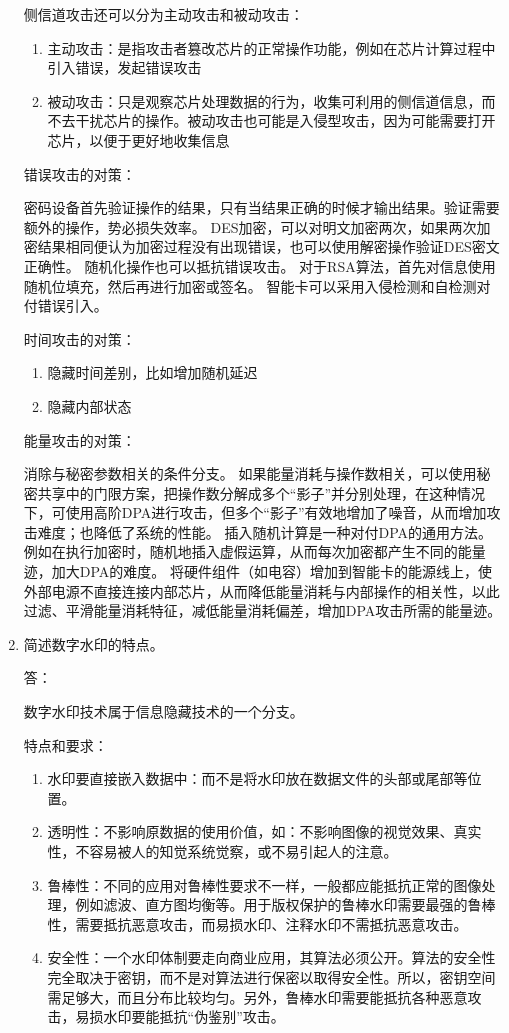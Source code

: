 \documentclass[degree=project,degree-type=project,cjk-font=noto]{thuthesis}
\begin{document}
\begin{enumerate}
侧信道攻击还可以分为主动攻击和被动攻击：

\begin{enumerate}
	\item 主动攻击：是指攻击者篡改芯片的正常操作功能，例如在芯片计算过程中引入错误，发起错误攻击
	\item 被动攻击：只是观察芯片处理数据的行为，收集可利用的侧信道信息，而不去干扰芯片的操作。被动攻击也可能是入侵型攻击，因为可能需要打开芯片，以便于更好地收集信息
\end{enumerate}

错误攻击的对策：

密码设备首先验证操作的结果，只有当结果正确的时候才输出结果。验证需要额外的操作，势必损失效率。
DES加密，可以对明文加密两次，如果两次加密结果相同便认为加密过程没有出现错误，也可以使用解密操作验证DES密文正确性。
随机化操作也可以抵抗错误攻击。
对于RSA算法，首先对信息使用随机位填充，然后再进行加密或签名。
智能卡可以采用入侵检测和自检测对付错误引入。

时间攻击的对策：

\begin{enumerate}
	\item 隐藏时间差别，比如增加随机延迟
	\item 隐藏内部状态
\end{enumerate}

能量攻击的对策：

消除与秘密参数相关的条件分支。
如果能量消耗与操作数相关，可以使用秘密共享中的门限方案，把操作数分解成多个“影子”并分别处理，在这种情况下，可使用高阶DPA进行攻击，但多个“影子”有效地增加了噪音，从而增加攻击难度；也降低了系统的性能。
插入随机计算是一种对付DPA的通用方法。例如在执行加密时，随机地插入虚假运算，从而每次加密都产生不同的能量迹，加大DPA的难度。
将硬件组件（如电容）增加到智能卡的能源线上，使外部电源不直接连接内部芯片，从而降低能量消耗与内部操作的相关性，以此过滤、平滑能量消耗特征，减低能量消耗偏差，增加DPA攻击所需的能量迹。

\item 简述数字水印的特点。

{\heiti 答：}
\newline

数字水印技术属于信息隐藏技术的一个分支。

特点和要求：

\begin{enumerate}
	\item 水印要直接嵌入数据中：而不是将水印放在数据文件的头部或尾部等位置。 
	\item 透明性：不影响原数据的使用价值，如：不影响图像的视觉效果、真实性，不容易被人的知觉系统觉察，或不易引起人的注意。 
	\item 鲁棒性：不同的应用对鲁棒性要求不一样，一般都应能抵抗正常的图像处理，例如滤波、直方图均衡等。用于版权保护的鲁棒水印需要最强的鲁棒性，需要抵抗恶意攻击，而易损水印、注释水印不需抵抗恶意攻击。 
	\item 安全性：一个水印体制要走向商业应用，其算法必须公开。算法的安全性完全取决于密钥，而不是对算法进行保密以取得安全性。所以，密钥空间需足够大，而且分布比较均匀。另外，鲁棒水印需要能抵抗各种恶意攻击，易损水印要能抵抗“伪鉴别”攻击。 
\end{enumerate}

\end{enumerate}
\end{document}
